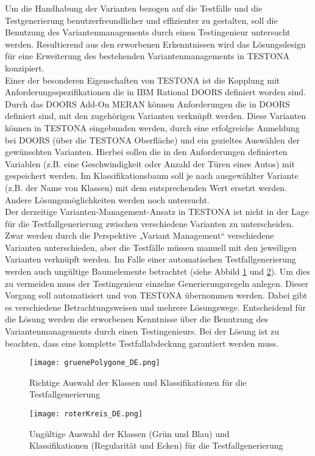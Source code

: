 Um die Handhabung der Varianten bezogen auf die Testfälle und die Testgenerierung benutzerfreundlicher und effizienter zu gestalten, soll die Benutzung des Variantenmanagements durch einen Testingenieur untersucht werden. Resultierend aus den erworbenen Erkenntnissen wird das Lösungsdesign für eine Erweiterung des bestehenden Variantenmanagements in TESTONA konzipiert.\\

Einer der besonderen Eigenschaften von TESTONA ist die Kopplung mit Anforderungsspezifikationen die in IBM Rational DOORS definiert worden sind. Durch das DOORS Add-On MERAN können Anforderungen die in DOORS definiert sind, mit den zugehörigen Varianten verknüpft werden. Diese Varianten können in TESTONA eingebunden werden, durch eine erfolgreiche Anmeldung bei DOORS (über die TESTONA Oberfläche) und ein gezieltes Auswählen der gewünschten Varianten. Hierbei sollen die in den Anforderungen definierten Variablen (z.B. eine Geschwindigkeit oder Anzahl der Türen eines Autos) mit gespeichert werden. Im Klassifikationsbaum soll je nach ausgewählter Variante (z.B. der Name von Klassen) mit dem entsprechenden Wert ersetzt werden. Andere Lösungsmöglichkeiten werden noch untersucht.\\

Der derzeitige Varianten-Management-Ansatz in TESTONA ist nicht in der Lage für die Testfallgenerierung zwischen verschiedene Varianten zu unterscheiden. Zwar werden durch die Perspektive „Variant Management“ verschiedene Varianten unterschieden, aber die Testfälle müssen manuell mit den jeweiligen Varianten verknüpft werden. Im Falle einer automatischen Testfallgenerierung werden auch ungültige Baumelemente betrachtet (siehe Abbild \ref{ttn.gruen} und \ref{ttn.rot}). Um dies zu vermeiden muss der Testingenieur einzelne Generierungsregeln anlegen. Dieser Vorgang soll automatisiert und von TESTONA übernommen werden. Dabei gibt es verschiedene Betrachtungsweisen und mehrere Lösungswege. Entscheidend für die Lösung werden die erworbenen Kenntnisse über die Benutzung des Variantenmanagements durch einen Testingenieurs. Bei der Lösung ist zu beachten, dass eine komplette Testfallabdeckung garantiert werden muss.\\


\begin{figure}[h]
  \begin{center}
    \texttt{[image: gruenePolygone\_DE.png]}
  		  \caption{Richtige Auswahl der Klassen und Klassifikationen für die Testfallgenerierung}
     \label{ttn.gruen}
  \end{center}
\end{figure}


\begin{figure}[h]
  \begin{center}
    \texttt{[image: roterKreis\_DE.png]}
  		  \caption{Ungültige Auswahl der Klassen (Grün und Blau) und Klassifikationen (Regularität und Ecken) für die Testfallgenerierung}
     \label{ttn.rot}
  \end{center}
\end{figure}